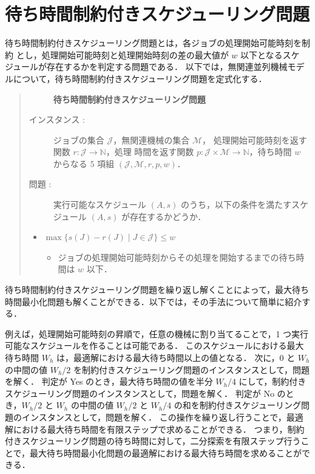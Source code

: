 \documentclass[12pt]{optlab-bachelor}
\begin{document}
\section{待ち時間制約付きスケジューリング問題}
待ち時間制約付きスケジューリング問題とは，各ジョブの処理開始可能時刻を制約
とし，処理開始可能時刻と処理開始時刻の差の最大値が $w$ 以下となるスケ
ジュールが存在するかを判定する問題である．
以下では，無関連並列機械モデルについて，待ち時間制約付きスケジューリング問題を定式化する．

\begin{quote}
  \begin{description}
    \item[] {\bf 待ち時間制約付きスケジューリング問題}
    \item[インスタンス : ]
    ジョブの集合 $\mathcal{J}$，無関連機械の集合 $\mathcal{M}$，
    処理開始可能時刻を返す関数 $r : \mathcal{J} \to \mathbb{N}$，処理
    時間を返す関数 $p : \mathcal{J} \times \mathcal{M} \to \mathbb{N}$，待ち時間 $w$ からなる 5 項組 $(\mathcal{J}, \mathcal{M}, r, p, w)$．

    \item[問題 : ] 実行可能なスケジュール $(A,s)$ のうち，以下の条件を満たすスケジュール $(A,s)$ が存在するかどうか．
  \end{description}

  \begin{itemize}
    \item $\max\big\{s(J) - r(J) \mid J \in \mathcal{J}\big\} \le w$
    \begin{itemize}
      \item ジョブの処理開始可能時刻からその処理を開始するまでの待ち時間は $w$ 以下．
    \end{itemize}
  \end{itemize}
\end{quote}

待ち時間制約付きスケジューリング問題を繰り返し解くことによって，最大待ち時間最小化問題も解くことができる．以下では，その手法について簡単に紹介する．

例えば，処理開始可能時刻の昇順で，任意の機械に割り当てることで，1 つ実行可能なスケジュールを作ることは可能である．
このスケジュールにおける最大待ち時間 $W_h$ は，最適解における最大待ち時間以上の値となる．
次に，$0$ と $W_h$ の中間の値 $W_h/2$ を制約付きスケジューリング問題のインスタンスとして，問題を解く．
判定が Yes のとき，最大待ち時間の値を半分 $W_h/4$ にして，制約付きスケジューリング問題のインスタンスとして，問題を解く．
判定が No のとき，$W_h/2$ と $W_h$ の中間の値 $W_h/2$ と $W_h/4$ の和を制約付きスケジューリング問題のインスタンスとして，問題を解く．
この操作を繰り返し行うことで，最適解における最大待ち時間を有限ステップで求めることができる．
つまり，制約付きスケジューリング問題の待ち時間に対して，二分探索を有限ステップ行うことで，最大待ち時間最小化問題の最適解における最大待ち時間を求めることができる．
\end{document}
